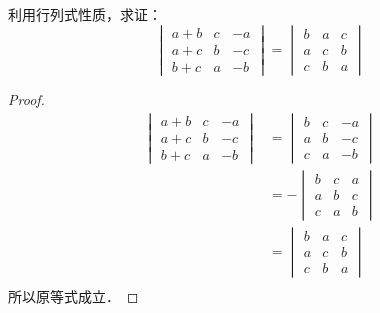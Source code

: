 \begin{example}
利用行列式性质，求证：
\[\begin{vmatrix}
    a+b&c&-a\\
    a+c&b&-c\\
    b+c&a&-b
\end{vmatrix}=\begin{vmatrix}
    b&a&c\\
    a&c&b\\
    c&b&a
\end{vmatrix}\]
\end{example}

\begin{proof}
\begin{align*}
    \begin{vmatrix}
        a+b&c&-a\\
        a+c&b&-c\\
        b+c&a&-b
    \end{vmatrix}&=\begin{vmatrix}
        b&c&-a\\
        a&b&-c\\
        c&a&-b
    \end{vmatrix}\tag{定理9}\\
    &=-\begin{vmatrix}
        b&c&a\\
        a&b&c\\
        c&a&b
    \end{vmatrix}\tag{定理5}\\
    &=\begin{vmatrix}
        b&a&c\\
        a&c&b\\
        c&b&a
    \end{vmatrix}\tag{定理2}\\
\end{align*}
    所以原等式成立．
\end{proof}

